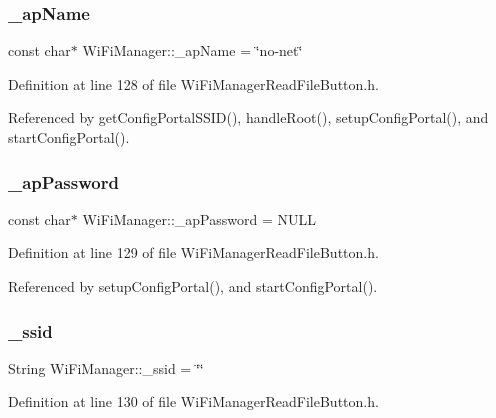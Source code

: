 \subsubsection{\texorpdfstring{\+\_\+ap\+Name}{\_apName}}
{\footnotesize\ttfamily const char$\ast$ Wi\+Fi\+Manager\+::\+\_\+ap\+Name = \char`\"{}no-\/net\char`\"{}\hspace{0.3cm}{\ttfamily [private]}}



Definition at line 128 of file Wi\+Fi\+Manager\+Read\+File\+Button.\+h.



Referenced by get\+Config\+Portal\+S\+S\+I\+D(), handle\+Root(), setup\+Config\+Portal(), and start\+Config\+Portal().

\mbox{\label{class_wi_fi_manager_a63fb98629ab722ec513c14c73f352c12}} 
\subsubsection{\texorpdfstring{\+\_\+ap\+Password}{\_apPassword}}
{\footnotesize\ttfamily const char$\ast$ Wi\+Fi\+Manager\+::\+\_\+ap\+Password = N\+U\+LL\hspace{0.3cm}{\ttfamily [private]}}



Definition at line 129 of file Wi\+Fi\+Manager\+Read\+File\+Button.\+h.



Referenced by setup\+Config\+Portal(), and start\+Config\+Portal().

\mbox{\label{class_wi_fi_manager_a43fdc9234ac52d98aeea31148f96526d}} 
\subsubsection{\texorpdfstring{\+\_\+ssid}{\_ssid}}
{\footnotesize\ttfamily String Wi\+Fi\+Manager\+::\+\_\+ssid = \char`\"{}\char`\"{}\hspace{0.3cm}{\ttfamily [private]}}



Definition at line 130 of file Wi\+Fi\+Manager\+Read\+File\+Button.\+h.



